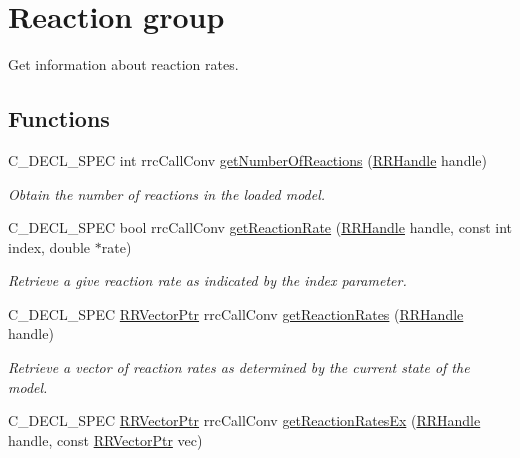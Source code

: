 \hypertarget{group__reaction}{}\section{Reaction group}
\label{group__reaction}


Get information about reaction rates.  


\subsection*{Functions}
\begin{DoxyCompactItemize}
\item 
C\+\_\+\+D\+E\+C\+L\+\_\+\+S\+P\+E\+C int rrc\+Call\+Conv \hyperlink{group__reaction_gaaa9941b7cba362c4098feedb02b047a4}{get\+Number\+Of\+Reactions} (\hyperlink{rrc__types_8h_a1d68f0592372208fa5a5f2799ea4b3ae}{R\+R\+Handle} handle)
\begin{DoxyCompactList}\small\item\em Obtain the number of reactions in the loaded model. \end{DoxyCompactList}\item 
C\+\_\+\+D\+E\+C\+L\+\_\+\+S\+P\+E\+C bool rrc\+Call\+Conv \hyperlink{group__reaction_ga6fbbae97760afea7cc74e26e2cb74926}{get\+Reaction\+Rate} (\hyperlink{rrc__types_8h_a1d68f0592372208fa5a5f2799ea4b3ae}{R\+R\+Handle} handle, const int index, double $\ast$rate)
\begin{DoxyCompactList}\small\item\em Retrieve a give reaction rate as indicated by the index parameter. \end{DoxyCompactList}\item 
C\+\_\+\+D\+E\+C\+L\+\_\+\+S\+P\+E\+C \hyperlink{rrc__types_8h_a3be72d6006034fd349f753d2bf441bf7}{R\+R\+Vector\+Ptr} rrc\+Call\+Conv \hyperlink{group__reaction_gae0d748f8af83914cc078f8728d67ed0e}{get\+Reaction\+Rates} (\hyperlink{rrc__types_8h_a1d68f0592372208fa5a5f2799ea4b3ae}{R\+R\+Handle} handle)
\begin{DoxyCompactList}\small\item\em Retrieve a vector of reaction rates as determined by the current state of the model. \end{DoxyCompactList}\item 
C\+\_\+\+D\+E\+C\+L\+\_\+\+S\+P\+E\+C \hyperlink{rrc__types_8h_a3be72d6006034fd349f753d2bf441bf7}{R\+R\+Vector\+Ptr} rrc\+Call\+Conv \hyperlink{group__reaction_ga106854f50f9896130fb77f64f2c5885c}{get\+Reaction\+Rates\+Ex} (\hyperlink{rrc__types_8h_a1d68f0592372208fa5a5f2799ea4b3ae}{R\+R\+Handle} handle, const \hyperlink{rrc__types_8h_a3be72d6006034fd349f753d2bf441bf7}{R\+R\+Vector\+Ptr} vec)

\end{DoxyCompactItemize}
